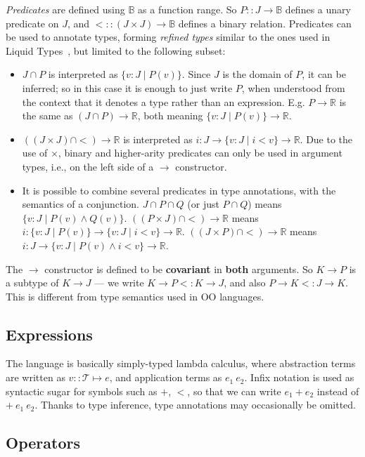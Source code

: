 \documentclass{article}
\newcommand\newterm[1]{{\it #1}}
\newcommand\R{\mathbb{R}}
\newcommand\B{\mathbb{B}}
\newcommand\T{\mathcal{T}}
\begin{document}
\medskip
\newterm{Predicates} are defined using $\B$ as a function range. So $P :: J\to\B$ defines a unary predicate
on $J$, and ${<} :: (J\times J)\to\B$ defines a binary relation.
Predicates can be used to annotate types, forming \newterm{refined types} similar to the ones
used in Liquid Types~\cite{PLDI08/Rondon}, but limited to the following subset:
\begin{itemize}
  \item $J\cap P$ is interpreted as $\{v:J\;|\;P(v)\}$. Since $J$ is the domain of $P$, it can be inferred;
    so in this case it is enough to just write $P$, when understood from the context that it denotes a
    type rather than an expression. E.g. $P\to\R$ is the same as $(J\cap P)\to\R$, both meaning
    $\{v:J\;|\;P(v)\}\to\R$.
  \item $((J\times J)\cap {<})\to\R$ is interpreted as $i:J\to\{v:J\;|\;i<v\}\to\R$. Due to the use of $\times$,
    binary and higher-arity predicates can only be used in argument types, i.e., on the left side of a $\to$
    constructor.
  \item It is possible to combine several predicates in type annotations, with the semantics of a conjunction.
    $J\cap P\cap Q$ (or just $P\cap Q$) means $\{v:J\;|\;P(v)\land Q(v)\}$.
    $((P\times J)\cap{<})\to\R$ means $i:\{v:J\;|\;P(v)\}\to\{v:J\;|\;i<v\}\to\R$.
    $((J\times P)\cap{<})\to\R$ means $i:J\to\{v:J\;|\;P(v)\land i<v\}\to\R$.
\end{itemize}

The $\to$ constructor is defined to be {\bf covariant} in {\bf both} arguments. So $K\to P$ is a subtype of $K\to J$
--- we write $K\to P <: K\to J$, and also $P\to K <: J\to K$. This is different from type semantics used in OO
languages.


\subsection{Expressions}

The language is basically simply-typed lambda calculus, where abstraction terms are written as
$v::\T\mapsto e$, and application terms as $e_1\ e_2$. Infix notation is used as syntactic sugar
for symbols such as $+$, $<$, so that we can write $e_1 + e_2$ instead of ${+}\ e_1\ e_2$.
Thanks to type inference, type annotations may occasionally be omitted.

\subsection{Operators}
\end{document}
